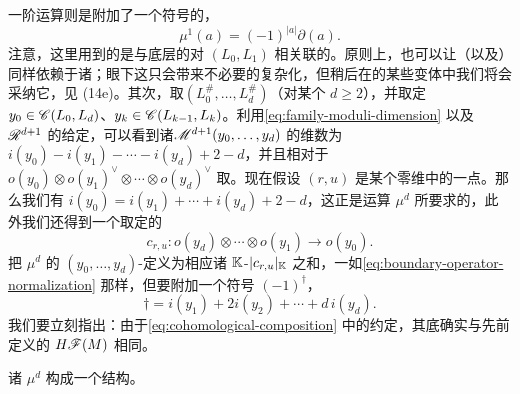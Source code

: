 一阶运算则是附加了一个符号的\trFloer{}\trBoundaryOperator，
\begin{equation*}
\mu^1(a)=(-1)^{|a|}\partial(a).
\end{equation*}
注意，这里用到的是与底层的\trLagrange\trSubmanifold{}对 $(L_0,L_1)$ 相关联的\trFloerDatum。原则上，也可以让\trFloerDatum（以及\trPerturbationDatum）同样依赖于诸\trBraneStructure；眼下这只会带来不必要的复杂化，但稍后在\trFukayaCategory{}的某些变体中我们将会采纳它，见 (14e)。其次，取\trBrane{}$(L_0^{\#},\ldots,L_d^{\#})$（对某个 $d\ge 2$），并取定 $y_0\in\mathscr{C}(L_0,L_d)$、$y_k\in\mathscr{C}(L_{k-1},L_k)$。利用\eqref{eq:family-moduli-dimension} 以及 $\mathscr{R}^{d+1}$ 的给定\trOrientation，可以看到诸\trModuliSpace{}$\mathscr{M}^{d+1}(y_0,\ldots,y_d)$ 的维数为 $i(y_0)-i(y_1)-\cdots-i(y_d)+2-d$，并且相对于 $o(y_0)\otimes o(y_1)^{\vee}\otimes\cdots\otimes o(y_d)^{\vee}$ 取\trOrientation。现在假设 $(r,u)$ 是某个零维\trModuliSpace{}中的一点。那么我们有 $i(y_0)=i(y_1)+\cdots+i(y_d)+2-d$，这正是运算 $\mu^d$ 所要求的\trGrading，此外我们还得到一个取定的\trIsomorphism
\begin{equation}\label{eq:preferred-isomorphism-mu}
c_{r,u}\colon o(y_d)\otimes\cdots\otimes o(y_1)\longrightarrow o(y_0).
\end{equation}
把 $\mu^d$ 的 $(y_0,\ldots,y_d)$-\trCoefficients{}定义为相应诸 $\mathbb{K}$-\trNormalization{}$|c_{r,u}|_{\mathbb{K}}$ 之和，一如\eqref{eq:boundary-operator-normalization} 那样，但要附加一个符号 $(-1)^{\dagger}$，
\begin{equation}\label{eq:dagger-sign-exponent}
\dagger=i(y_1)+2i(y_2)+\cdots+d\,i(y_d).
\end{equation}
我们要立刻指出：由于\eqref{eq:cohomological-composition} 中的约定，其底\trCohomology{}\trCategory{}确实与先前定义的 $H\mathscr{F}(M)$ 相同。
\begin{proposition}\label{thm:mu-form-a-infinity-structure}
诸 $\mu^d$ 构成一个\trAinfty{}结构。
\end{proposition}
